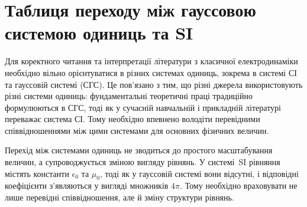 


\section{Таблиця переходу між гауссовою системою одиниць та SI}\label{sec:SGStoSI}\hypertarget{SGStoSI}{}

Для коректного читання та інтерпретації літератури з класичної електродинаміки необхідно вільно орієнтуватися в різних системах одиниць, зокрема в системі СІ та гауссовій системі (СГС). Це пов'язано з тим, що різні джерела використовують різні системи одиниць: фундаментальні теоретичні праці традиційно формулюються в СГС, тоді як у сучасній навчальній і прикладній літературі переважає система СІ. Тому необхідно впевнено володіти перевідними співвідношеннями між цими системами для основних фізичних величин.

Перехід між системами одиниць не зводиться до простого масштабування величин, а супроводжується зміною вигляду рівнянь. У системі~SI рівняння містять константи \(\epsilon_0\) та \(\mu_0\), тоді як у гауссовій системі вони відсутні, і відповідні коефіцієнти з'являються у вигляді множників \(4 \pi \). Тому необхідно враховувати не лише перевідні співвідношення, але й зміну структури рівнянь.

